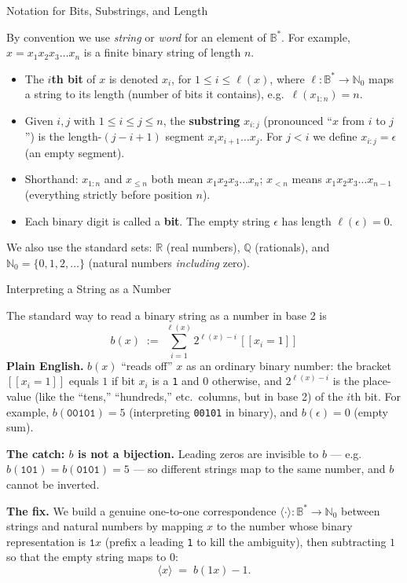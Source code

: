 \documentclass[aspectratio=169,10pt]{beamer}
\newcommand{\Bs}{\mathbb{B}^{*}}
\newcommand{\len}{\ell}
\newcommand{\bij}[1]{\langle #1\rangle}
\begin{document}
\begin{frame}{Notation for Bits, Substrings, and Length}

By convention we use \emph{string} or \emph{word} for an element of $\Bs$.
For example, $x=x_1x_2x_3\dots x_n$ is a finite binary string of length $n$.

\begin{itemize}
  \item The \textbf{$i$th bit} of $x$ is denoted $x_i$, for $1\leq i\leq
    \len(x)$, where $\len:\Bs\to\mathbb{N}_0$ maps a string to its length
    (number of bits it contains), e.g.\ $\len(x_{1:n})=n$.
  \item Given $i,j$ with $1\leq i\leq j\leq n$, the \textbf{substring}
    $x_{i:j}$ (pronounced ``$x$ from $i$ to $j$'') is the length-$(j-i+1)$
    segment $x_ix_{i+1}\dots x_j$. For $j<i$ we define $x_{i:j}=\epsilon$
    (an empty segment).
  \item Shorthand: $x_{1:n}$ and $x_{\leq n}$ both mean $x_1x_2x_3\dots
    x_n$; $x_{<n}$ means $x_1x_2x_3\dots x_{n-1}$ (everything strictly
    before position $n$).
  \item Each binary digit is called a \textbf{bit}. The empty string
    $\epsilon$ has length $\len(\epsilon)=0$.
\end{itemize}

\medskip
We also use the standard sets: $\mathbb{R}$ (real numbers), $\mathbb{Q}$
(rationals), and $\mathbb{N}_0=\{0,1,2,\dots\}$ (natural numbers
\emph{including} zero).
\end{frame}

\begin{frame}{Interpreting a String as a Number}

The standard way to read a binary string as a number in base 2 is
\[
  b(x) \;:=\; \sum_{i=1}^{\len(x)} 2^{\len(x)-i}\,[\![x_i=1]\!]
\]
\textbf{Plain English.} $b(x)$ ``reads off'' $x$ as an ordinary binary
number: the bracket $[\![x_i=1]\!]$ equals $1$ if bit $x_i$ is a \texttt{1}
and $0$ otherwise, and $2^{\len(x)-i}$ is the place-value (like the
``tens,'' ``hundreds,'' etc.\ columns, but in base 2) of the $i$th bit. For
example, $b(\texttt{00101})=5$ (interpreting \texttt{00101} in binary), and
$b(\epsilon)=0$ (empty sum).

\medskip
\textbf{The catch: $b$ is not a bijection.} Leading zeros are invisible to
$b$ --- e.g.\ $b(\texttt{101})=b(\texttt{0101})=5$ --- so different strings
map to the same number, and $b$ cannot be inverted.

\medskip
\textbf{The fix.} We build a genuine one-to-one correspondence
$\bij{\cdot}:\Bs\to\mathbb{N}_0$ between strings and natural numbers by
mapping $x$ to the number whose binary representation is $\texttt{1}x$
(prefix a leading \texttt{1} to kill the ambiguity), then subtracting $1$
so that the empty string maps to $0$:
\[
  \bij{x} \;=\; b(1x) - 1 .
\]
\end{frame}
\end{document}
